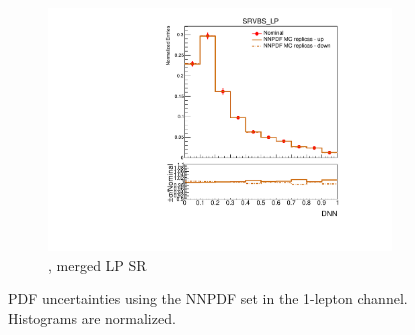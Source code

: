 \begin{figure}[ht]
\begin{subfigure}[b]{0.3\textwidth}
        \includegraphics[width=\textwidth]{figures/1lep/PDFUnc/NNPDF/Z_0ptag1pfat0pjet_0ptv_SRVBS_LP_DNN_SysTheoryPDF_NNPDF_Z__1up_Norm.pdf}
        \caption{\Zjets, merged LP SR}
    \end{subfigure}
    \caption{PDF uncertainties using the NNPDF set in the 1-lepton channel. Histograms are normalized.}
    \label{fig:PDFUnc1Lep_bkg}
\end{figure}


